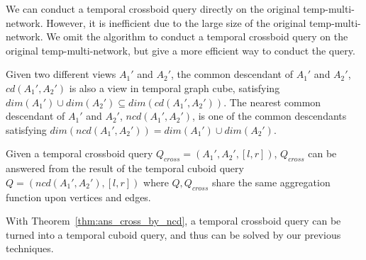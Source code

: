 \documentclass[10pt,journal,compsoc]{IEEEtran}
\begin{document}
We can conduct a temporal crossboid query directly on the original temp-multi-network. However, it is inefficient due to the large size of the original temp-multi-network. We omit the algorithm to conduct a temporal crossboid query on the original temp-multi-network, but give a more efficient way to conduct the query.
\begin{definition}
	\label{def:ncd}
	Given two different views $ A_1' $ and $ A_2' $, the common descendant of $ A_1' $ and $ A_2' $, $ cd(A_1',A_2') $ is also a view in temporal graph cube, satisfying $ dim(A_1') \cup dim(A_2') \subseteq dim(cd(A_1',A_2')) $. The nearest common descendant of $ A_1' $ and $ A_2' $, $ ncd(A_1',A_2') $, is one of the common descendants satisfying $ dim(ncd(A_1',A_2'))=dim(A_1') \cup dim(A_2') $.
\end{definition}
\begin{theorem}
	\label{thm:ans_cross_by_ncd}
	Given a temporal crossboid query $ Q_{cross}=(A_1',A_2',[l,r]) $, $ Q_{cross} $ can be answered from the result of the temporal cuboid query $ Q=(ncd(A_1',A_2'),[l,r]) $ where $ Q,Q_{cross} $ share the same aggregation function upon vertices and edges.
\end{theorem}
With Theorem~\ref{thm:ans_cross_by_ncd}, a temporal crossboid query can be turned into a temporal cuboid query, and thus can be solved by our previous techniques.
\end{document}
